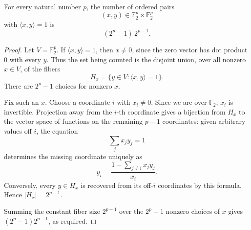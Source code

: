 \begin{helper}
For every natural number \(p\), the number of ordered pairs
\[
  (x,y)\in \mathbb F_2^p\times\mathbb F_2^p
\]
with \(\langle x,y\rangle=1\) is
\[
  (2^p-1)\,2^{p-1}.
\]
\end{helper}
\begin{proof}
Let \(V=\mathbb F_2^p\). If \(\langle x,y\rangle=1\), then \(x\ne0\), since the
zero vector has dot product \(0\) with every \(y\). Thus the set being counted is
the disjoint union, over all nonzero \(x\in V\), of the fibers
\[
  H_x=\{y\in V:\langle x,y\rangle=1\}.
\]
There are \(2^p-1\) choices for nonzero \(x\).

Fix such an \(x\). Choose a coordinate \(i\) with \(x_i\ne0\). Since we are over
\(\mathbb F_2\), \(x_i\) is invertible. Projection away from the \(i\)-th
coordinate gives a bijection from \(H_x\) to the vector space of functions on
the remaining \(p-1\) coordinates: given arbitrary values off \(i\), the equation
\[
  \sum_j x_jy_j=1
\]
determines the missing coordinate uniquely as
\[
  y_i=\frac{1-\sum_{j\ne i}x_jy_j}{x_i}.
\]
Conversely, every \(y\in H_x\) is recovered from its off-\(i\) coordinates by
this formula. Hence \(|H_x|=2^{p-1}\).

Summing the constant fiber size \(2^{p-1}\) over the \(2^p-1\) nonzero choices
of \(x\) gives \((2^p-1)2^{p-1}\), as required.
\end{proof}
